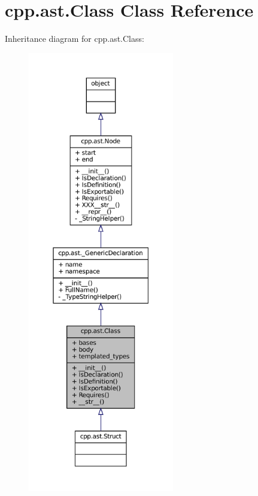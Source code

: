 \hypertarget{classcpp_1_1ast_1_1Class}{}\section{cpp.\+ast.\+Class Class Reference}
\label{classcpp_1_1ast_1_1Class}


Inheritance diagram for cpp.\+ast.\+Class\+:
\nopagebreak
\begin{figure}[H]
\begin{center}
\leavevmode
\includegraphics[height=550pt]{classcpp_1_1ast_1_1Class__inherit__graph}
\end{center}
\end{figure}



